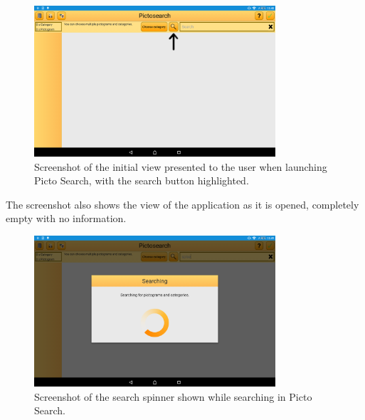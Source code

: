 \begin{figure}[h]
    \centering
    \includegraphics[width=0.8\textwidth]{figures/img/screenshots/old_startup.png}
    \caption{Screenshot of the initial view presented to the user when launching Picto Search, with the search button highlighted.}\label{fig:screenshot_startup}
\end{figure}
\noindent
The screenshot also shows the view of the application as it is opened, completely empty with no information.

\begin{figure}[h]
    \centering
    \includegraphics[width=0.8\textwidth]{figures/img/screenshots/old_dialog.png}
    \caption{Screenshot of the search spinner shown while searching in Picto Search.}\label{fig:screenshot_searchspinner}
\end{figure}

